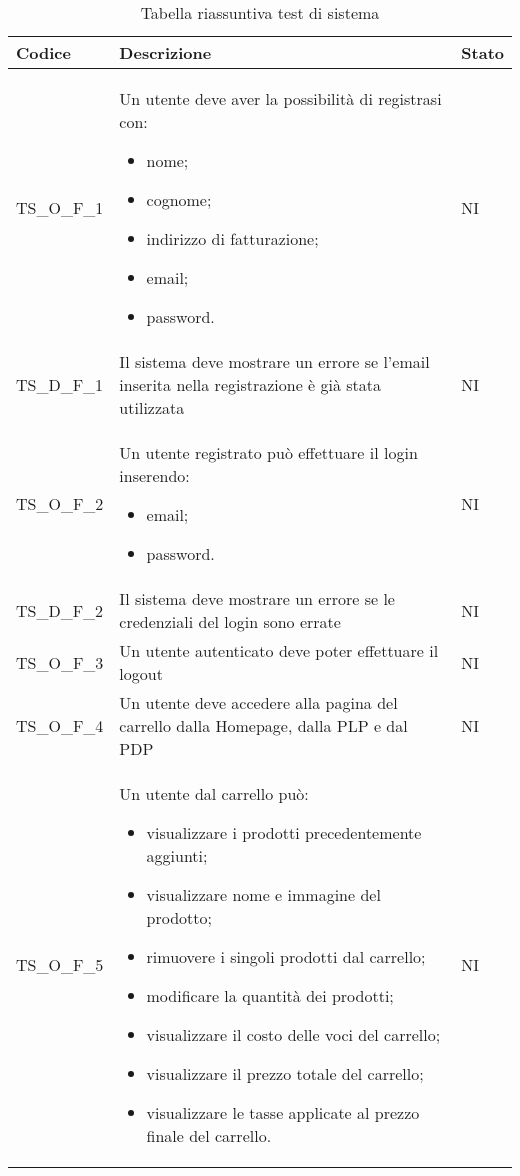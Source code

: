 {

\centering
\renewcommand{\arraystretch}{2}
\begin{longtable}{C{3cm} C{10.2cm} C{1.5cm}}
\caption{Tabella riassuntiva test di sistema}\\
\textbf{Codice} &
\textbf{Descrizione}&
\textbf{Stato}\\
\endhead


TS\_O\_F\_1 & Un utente deve aver la possibilità di registrasi con:
\begin{itemize}
	\item nome;
	\item cognome;
	\item indirizzo di fatturazione;
	\item email;
	\item password.
\end{itemize} & NI\\
TS\_D\_F\_1 & Il sistema deve mostrare un errore se
l’email inserita nella registrazione è già stata utilizzata & NI\\
TS\_O\_F\_2 & Un utente registrato può effettuare il login inserendo:
\begin{itemize}
	\item email;
	\item password.
\end{itemize} &  NI\\
TS\_D\_F\_2 & Il sistema deve mostrare un errore se le credenziali del login sono errate & NI\\
TS\_O\_F\_3 & Un utente autenticato deve poter effettuare il
logout & NI\\
TS\_O\_F\_4 & Un utente deve accedere alla pagina del carrello dalla Homepage, dalla PLP e dal PDP & NI\\




TS\_O\_F\_5 & Un utente dal carrello può:
\begin{itemize}
	\item visualizzare i prodotti precedentemente aggiunti;
	\item visualizzare nome e immagine del prodotto;
	\item rimuovere i singoli prodotti dal carrello;
	\item modificare la quantità dei prodotti;
	\item visualizzare il costo delle voci del carrello;
	\item visualizzare il prezzo totale del carrello;
	\item visualizzare le tasse applicate al prezzo finale del carrello.
\end{itemize}
& NI\\


\end{longtable}}
